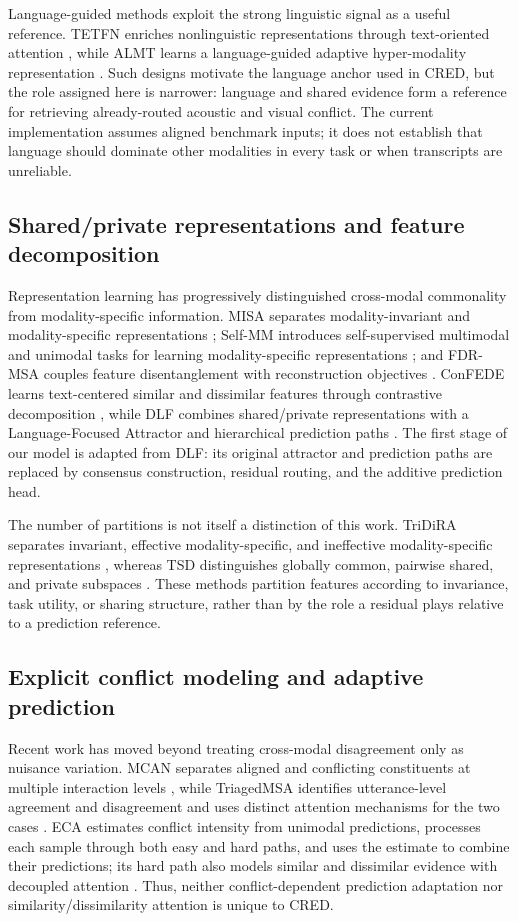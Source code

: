\documentclass[review,12pt]{elsarticle}
\begin{document}
Language-guided methods exploit the strong linguistic signal as a useful reference. TETFN enriches nonlinguistic representations through text-oriented attention \cite{tetfn}, while ALMT learns a language-guided adaptive hyper-modality representation \cite{almt}. Such designs motivate the language anchor used in CRED, but the role assigned here is narrower: language and shared evidence form a reference for retrieving already-routed acoustic and visual conflict. The current implementation assumes aligned benchmark inputs; it does not establish that language should dominate other modalities in every task or when transcripts are unreliable.

\subsection{Shared/private representations and feature decomposition}
Representation learning has progressively distinguished cross-modal commonality from modality-specific information. MISA separates modality-invariant and modality-specific representations \cite{misa}; Self-MM introduces self-supervised multimodal and unimodal tasks for learning modality-specific representations \cite{selfmm}; and FDR-MSA couples feature disentanglement with reconstruction objectives \cite{fdrmsa}. ConFEDE learns text-centered similar and dissimilar features through contrastive decomposition \cite{confede}, while DLF combines shared/private representations with a Language-Focused Attractor and hierarchical prediction paths \cite{dlf}. The first stage of our model is adapted from DLF: its original attractor and prediction paths are replaced by consensus construction, residual routing, and the additive prediction head.

The number of partitions is not itself a distinction of this work. TriDiRA separates invariant, effective modality-specific, and ineffective modality-specific representations \cite{tridira}, whereas TSD distinguishes globally common, pairwise shared, and private subspaces \cite{tsd}. These methods partition features according to invariance, task utility, or sharing structure, rather than by the role a residual plays relative to a prediction reference.

\subsection{Explicit conflict modeling and adaptive prediction}
Recent work has moved beyond treating cross-modal disagreement only as nuisance variation. MCAN separates aligned and conflicting constituents at multiple interaction levels \cite{mcan}, while TriagedMSA identifies utterance-level agreement and disagreement and uses distinct attention mechanisms for the two cases \cite{triagedmsa}. ECA estimates conflict intensity from unimodal predictions, processes each sample through both easy and hard paths, and uses the estimate to combine their predictions; its hard path also models similar and dissimilar evidence with decoupled attention \cite{eca}. Thus, neither conflict-dependent prediction adaptation nor similarity/dissimilarity attention is unique to CRED.
\end{document}
